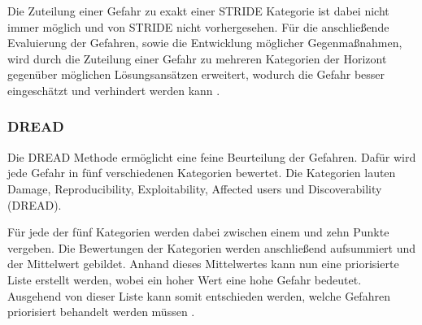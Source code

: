 Die Zuteilung einer Gefahr zu exakt einer STRIDE Kategorie ist dabei nicht immer möglich und von STRIDE nicht vorhergesehen.
Für die anschließende Evaluierung der Gefahren, sowie die Entwicklung möglicher Gegenmaßnahmen, wird durch die Zuteilung einer Gefahr zu mehreren Kategorien der Horizont gegenüber möglichen Lösungsansätzen erweitert, wodurch die Gefahr besser eingeschätzt und verhindert werden kann \autocite[vgl.][S. 61-64]{shostack_threat_2014}.




\subsubsection{DREAD}
Die DREAD Methode ermöglicht eine feine Beurteilung der Gefahren.
Dafür wird jede Gefahr in fünf verschiedenen Kategorien bewertet.
Die Kategorien lauten Damage, Reproducibility, Exploitability, Affected users und Discoverability (DREAD).

Für jede der fünf Kategorien werden dabei zwischen einem und zehn Punkte vergeben.
Die Bewertungen der Kategorien werden anschließend aufsummiert und der Mittelwert gebildet.
Anhand dieses Mittelwertes kann nun eine priorisierte Liste erstellt werden, wobei ein hoher Wert eine hohe Gefahr bedeutet.
Ausgehend von dieser Liste kann somit entschieden werden, welche Gefahren priorisiert behandelt werden müssen \autocite[vgl.][]{domars_threat_2023}.
